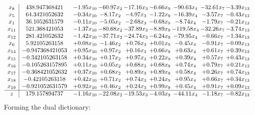 \documentclass[8pt]{article}
\begin{document}
\[\begin{array}{c| c c@{\hskip 2pt} c@{\hskip 2pt} c@{\hskip 2pt} c@{\hskip 2pt} c@{\hskip 2pt} c@{\hskip 2pt} c@{\hskip 2pt} }
 x_{8}   &  438.947368421 & -1.95 x_{10} & -60.97 x_{2} & -17.16 x_{3} & -6.66 x_{9} & -90.63 x_{4} & -32.61 x_{7} & -3.39 x_{13}\\
 x_{5}   &  64.3421052632 & -0.34 x_{10} & -8.17 x_{2} & -4.97 x_{3} & -1.22 x_{9} & -16.39 x_{4} & -3.57 x_{7} & -0.43 x_{13}\\
 x_{1}   &  36.1052631579 & -0.11 x_{10} & -5.05 x_{2} & -2.68 x_{3} & -0.68 x_{9} & -8.74 x_{4} & -1.79 x_{7} & -0.21 x_{13}\\
 x_{11}   &  521.368421053 & -1.37 x_{10} & -80.68 x_{2} & -37.89 x_{3} & -8.89 x_{9} & -119.58 x_{4} & -32.26 x_{7} & -3.74 x_{13}\\
 x_{12}   &  281.421052632 & -1.42 x_{10} & -37.71 x_{2} & -24.74 x_{3} & -6.24 x_{9} & -79.95 x_{4} & -0.66 x_{7} & -1.34 x_{13}\\
 x_{6}   &  5.92105263158 & +  0.08 x_{10} & -1.46 x_{2} & +  0.76 x_{3} & +  0.01 x_{9} & -0.45 x_{4} & -0.91 x_{7} & -0.09 x_{13}\\
 x_{14}   &  -0.947368421053 & +  0.95 x_{10} & +  0.97 x_{2} & +  0.16 x_{3} & +  0.66 x_{9} & +  0.63 x_{4} & +  0.61 x_{7} & +  0.39 x_{13}\\
 x_{15}   &  -0.342105263158 & +  0.34 x_{10} & +  0.17 x_{2} & +  0.97 x_{3} & +  0.22 x_{9} & +  0.39 x_{4} & +  0.57 x_{7} & +  0.43 x_{13}\\
 x_{16}   &  -0.105263157895 & +  0.11 x_{10} & +  0.05 x_{2} & +  0.68 x_{3} & +  0.68 x_{9} & +  0.74 x_{4} & +  0.79 x_{7} & +  0.21 x_{13}\\
 x_{17}   &  -0.368421052632 & +  0.37 x_{10} & +  0.68 x_{2} & +  0.89 x_{3} & +  0.89 x_{9} & +  0.58 x_{4} & +  0.26 x_{7} & +  0.74 x_{13}\\
 x_{18}   &  -0.42105263158 & +  0.42 x_{10} & +  0.71 x_{2} & +  0.74 x_{3} & +  0.24 x_{9} & +  0.95 x_{4} & +  0.66 x_{7} & +  0.34 x_{13}\\
 x_{19}   &  -0.921052631579 & +  0.92 x_{10} & +  0.46 x_{2} & +  0.24 x_{3} & +  0.99 x_{9} & +  0.45 x_{4} & +  0.91 x_{7} & +  0.09 x_{13}\\
\hline
z    &  179.157894737 & -1.16 x_{10} & -22.08 x_{2} & -19.53 x_{3} & -4.03 x_{9} & -44.11 x_{4} & -1.18 x_{7} & -0.82 x_{13}\\
\end{array}\]
Forming the dual dictionary:
\end{document}
